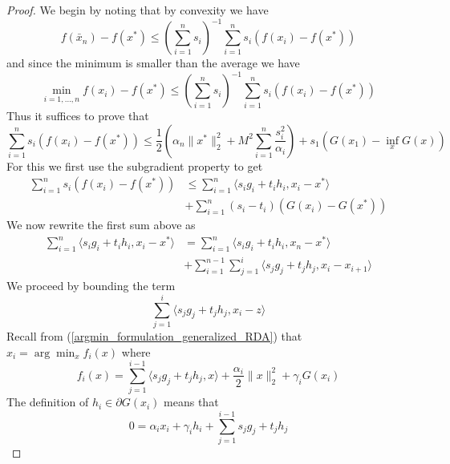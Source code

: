 \begin{proof}
  We begin by noting that by convexity we have
 \begin{equation}
  f(\bar{x}_n) - f(x^*) \leq \left(\displaystyle\sum_{i = 1}^n s_i\right)^{-1}\displaystyle\sum_{i = 1}^n s_i(f(x_i) - f(x^*))
 \end{equation}
 and since the minimum is smaller than the average we have
 \begin{equation}
  \min_{i = 1,...,n} f(x_i) - f(x^*) \leq \left(\displaystyle\sum_{i = 1}^n s_i\right)^{-1}\displaystyle\sum_{i = 1}^n s_i(f(x_i) - f(x^*))
 \end{equation}
 Thus it suffices to prove that
 \begin{equation}
 \displaystyle\sum_{i = 1}^n s_i(f(x_i) - f(x^*)) \leq 
 \frac{1}{2}\left(\alpha_n\|x^*\|_2^2 + M^2\displaystyle\sum_{i = 1}^n \frac{s_i^2}{\alpha_i}\right)+ s_1(G(x_1) - \inf_x G(x))
 \end{equation}
 For this we first use the subgradient property to get
 \begin{align}\label{eq_rda_100}
  \displaystyle\sum_{i = 1}^n s_i(f(x_i) - f(x^*)) &\leq \displaystyle\sum_{i = 1}^n \langle s_ig_i + t_ih_i, x_i - x^*\rangle \\
  &+ \displaystyle\sum_{i = 1}^n (s_i - t_i)(G(x_i) - G(x^*))
 \end{align}
 We now rewrite the first sum above as
 \begin{align}\label{eq_rda_105}
  \displaystyle\sum_{i = 1}^n \langle s_ig_i + t_ih_i, x_i - x^*\rangle &= \displaystyle\sum_{i = 1}^n \langle s_ig_i + t_ih_i, x_n - x^*\rangle \\
  &+ \displaystyle\sum_{i = 1}^{n-1} \displaystyle\sum_{j = 1}^i\langle s_jg_j + t_jh_j, x_i - x_{i+1}\rangle 
 \end{align}
 We proceed by bounding the term
 \begin{equation}
  \sum_{j = 1}^i\langle s_jg_j + t_jh_j, x_i - z\rangle
 \end{equation}
 Recall from (\ref{argmin_formulation_generalized_RDA}) that $x_i = \arg\min_x f_i(x)$ where
 \begin{equation}
  f_i(x) = \displaystyle\sum_{j = 1}^{i-1} \langle s_jg_j + t_jh_j, x\rangle + \frac{\alpha_{i}}{2}\|x\|_2^2 + \gamma_i G(x_i)
 \end{equation}
 The definition of $h_i\in \partial G(x_i)$ means that
 \begin{equation}
  0 = \alpha_i x_i + \gamma_i h_i + \displaystyle\sum_{j = 1}^{i-1} s_jg_j + t_jh_j
 \end{equation}

\end{proof}
